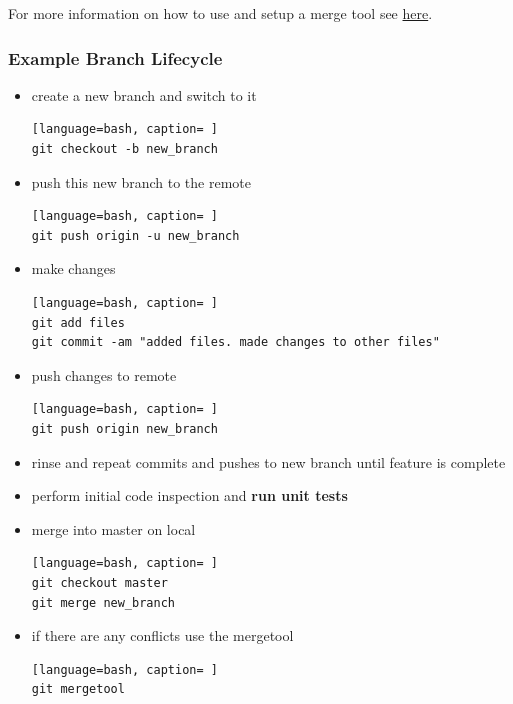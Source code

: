 \noindent
For more information on how to use and setup a merge tool see \href{https://git-scm.com/docs/git-mergetool}{here}.

\subsubsection{Example Branch Lifecycle}

\begin{itemize}
\item{create a new branch and switch to it}

\begin{lstlisting}[language=bash, caption= ]
git checkout -b new_branch 
\end{lstlisting}

\item{push this new branch to the remote}

\begin{lstlisting}[language=bash, caption= ]
git push origin -u new_branch
\end{lstlisting}

\item{make changes} 

\begin{lstlisting}[language=bash, caption= ]
git add files 
git commit -am "added files. made changes to other files" 
\end{lstlisting}

\item{push changes to remote}

\begin{lstlisting}[language=bash, caption= ]
git push origin new_branch
\end{lstlisting}

\item{rinse and repeat commits and pushes to new branch until feature is complete}
\item{perform initial code inspection and \textbf{run unit tests}}
\item{merge into master on local}

\begin{lstlisting}[language=bash, caption= ]
git checkout master
git merge new_branch
\end{lstlisting}

\item{if there are any conflicts use the mergetool}

\begin{lstlisting}[language=bash, caption= ]
git mergetool
\end{lstlisting}


\end{itemize}
